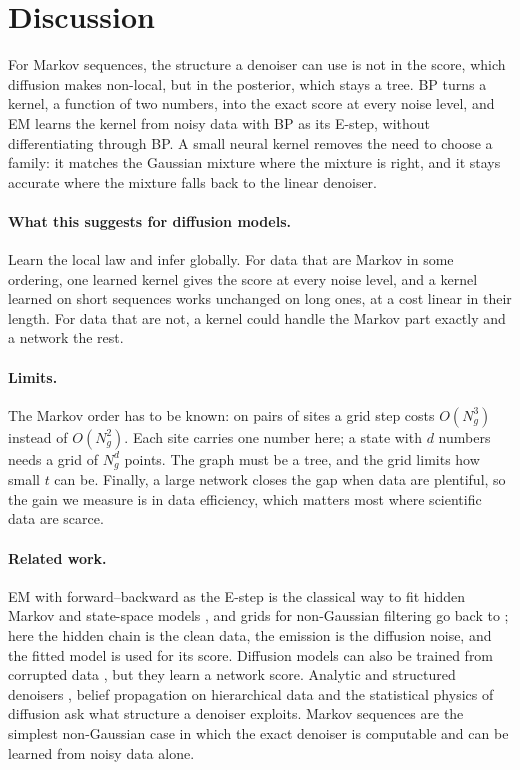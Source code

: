 \section{Discussion}
\label{sec:discussion}

For Markov sequences, the structure a denoiser can use is not in the score, which diffusion makes non-local, but in the
posterior, which stays a tree. BP turns a kernel, a function of two numbers, into the exact score at every noise level,
and EM learns the kernel from noisy data with BP as its E-step, without differentiating through BP. A small neural
kernel removes the need to choose a family: it matches the Gaussian mixture where the mixture is right, and it stays
accurate where the mixture falls back to the linear denoiser.

\paragraph{What this suggests for diffusion models.} Learn the local law and infer globally. For data that are Markov
in some ordering, one learned kernel gives the score at every noise level, and a kernel learned on short sequences works
unchanged on long ones, at a cost linear in their length. For data that are not, a kernel could handle the Markov part
exactly and a network the rest.

\paragraph{Limits.} The Markov order has to be known: on pairs of sites a grid step costs $O(N_g^3)$ instead of
$O(N_g^2)$. Each site carries one number here; a state with $d$ numbers needs a grid of $N_g^d$ points. The graph must be
a tree, and the grid limits how small $t$ can be. Finally, a large network closes the gap when data are plentiful, so the
gain we measure is in data efficiency, which matters most where scientific data are scarce.

\paragraph{Related work.} EM with forward--backward as the E-step is the classical way to fit hidden Markov and
state-space models \cite{baum1970,rabiner1989tutorial,shumway1982em,cappe2005}, and grids for non-Gaussian filtering go
back to \cite{kitagawa1987}; here the hidden chain is the clean data, the emission is the diffusion noise, and the
fitted model is used for its score. Diffusion models can also be trained from corrupted data
\cite{daras2023ambient,rozet2024learning,bai2024em}, but they learn a network score. Analytic and structured denoisers
\cite{kamb2024analytic,kadkhodaie2024generalization}, belief propagation on hierarchical data
\cite{garnierbrun2024transformers,sclocchi2025phase,mei2024unets} and the statistical physics of diffusion
\cite{biroli2023generative,biroli2024dynamical,achilli2025memorization,bonnaire2025memorize,garnierbrun2026biased,garnierbrun2026foam}
ask what structure a denoiser exploits. Markov sequences are the simplest non-Gaussian case in which the exact denoiser
is computable and can be learned from noisy data alone.
